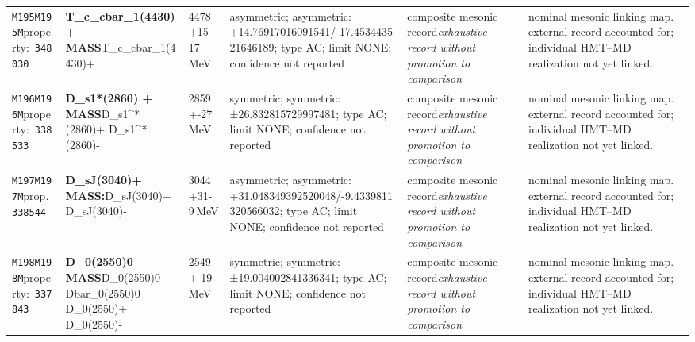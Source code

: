 \begin{landscape}
\begin{longtable}{L{1.85cm}L{4.45cm}L{2.35cm}L{4.05cm}L{3.35cm}L{7.15cm}}
\texttt{M195}\newline \texttt{M195M}\newline property:\ \texttt{348030} & \textbf{T\_\allowbreak{}c\_\allowbreak{}cbar\_\allowbreak{}1(4430)+ MASS}\newline T\_\allowbreak{}c\_\allowbreak{}cbar\_\allowbreak{}1(4430)+ & 4478+15-17\,MeV & asymmetric; asymmetric: +14.76917016091541/-17.453443521646189; type AC; limit NONE; confidence not reported & composite mesonic record\newline \emph{exhaustive record without promotion to comparison} & nominal mesonic linking map. external record accounted for; individual HMT--MD realization not yet linked. \\
\texttt{M196}\newline \texttt{M196M}\newline property:\ \texttt{338533} & \textbf{D\_\allowbreak{}s1*(2860) + MASS}\newline D\_\allowbreak{}s1\textasciicircum{}*(2860)+ \textbar{}\allowbreak{} D\_\allowbreak{}s1\textasciicircum{}*(2860)- & 2859+-27\,MeV & symmetric; symmetric: ±26.832815729997481; type AC; limit NONE; confidence not reported & composite mesonic record\newline \emph{exhaustive record without promotion to comparison} & nominal mesonic linking map. external record accounted for; individual HMT--MD realization not yet linked. \\
\texttt{M197}\newline \texttt{M197M}\newline prop.\ \texttt{338544} & \textbf{D\_\allowbreak{}sJ(3040)+ MASS:}\newline D\_\allowbreak{}sJ(3040)+ \textbar{}\allowbreak{} D\_\allowbreak{}sJ(3040)- & 3044+31-9\,MeV & asymmetric; asymmetric: +31.048349392520048/-9.4339811320566032; type AC; limit NONE; confidence not reported & composite mesonic record\newline \emph{exhaustive record without promotion to comparison} & nominal mesonic linking map. external record accounted for; individual HMT--MD realization not yet linked. \\
\texttt{M198}\newline \texttt{M198M}\newline property:\ \texttt{337843} & \textbf{D\_\allowbreak{}0(2550)0 MASS}\newline D\_\allowbreak{}0(2550)0 \textbar{}\allowbreak{} Dbar\_\allowbreak{}0(2550)0 \textbar{}\allowbreak{} D\_\allowbreak{}0(2550)+ \textbar{}\allowbreak{} D\_\allowbreak{}0(2550)- & 2549+-19\,MeV & symmetric; symmetric: ±19.004002841336341; type AC; limit NONE; confidence not reported & composite mesonic record\newline \emph{exhaustive record without promotion to comparison} & nominal mesonic linking map. external record accounted for; individual HMT--MD realization not yet linked. \\

\end{longtable}
\end{landscape}
